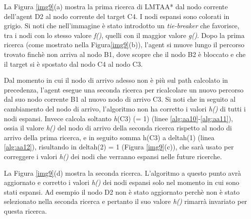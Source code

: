 \documentclass[11pt]{book}
\begin{document}
\par{La Figura \ref{img9}(a) mostra la prima ricerca di LMTAA* dal nodo corrente dell'agent D2 al nodo corrente del target C4. I nodi espansi sono colorati in grigio. Si noti che nell'immagine \`e stato introdotto un \emph{tie-breaker} che favorisce, tra i nodi con lo stesso valore \emph{f()}, quelli con il maggior valore \emph{g()}. Dopo la prima ricerca (come mostrato nella Figura\ref{img9}(b)), l'agent si muove lungo il percorso trovato finch\`e non arriva al nodo B1, dove scopre che il nodo B2 \`e bloccato e che il target si \`e spostato dal nodo C4 al nodo C3.}
\par{Dal momento in cui il nodo di arrivo adesso non \`e pi\`u sul path calcolato in precedenza, l'agent esegue una seconda ricerca per ricalcolare un nuovo percorso dal suo nodo corrente B1 al nuovo nodo di arrivo C3. Si noti che in seguito al cambiamento del nodo di arrivo, l'algoritmo non ha corretto i valori \emph{h()} di tutti i nodi espansi. Invece calcola soltanto \emph{h}(C3) (= 1) (linee \ref{alg:aa10}-\ref{alg:aa11}), ossia il valore \emph{h()} del nodo di arrivo della seconda ricerca rispetto al nodo di arrivo della prima ricerca, e in seguito somma h(C3) a deltah(1) (linea \ref{alg:aa12}), risultando in deltah(2) = 1 (Figura \ref{img9}(c)), che sar\`a usato per correggere i valori \emph{h()} dei nodi che verranno espansi nelle future ricerche.}
\par{La Figura \ref{img9}(d) mostra la seconda ricerca. L'algoritmo a questo punto avr\`a aggiornato e corretto i valori \emph{h()} dei nodi espansi solo nel momento in cui sono stati espansi. Ad esempio il nodo D2 non \`e stato aggiornato perch\`e non \`e stato selezionato nella seconda ricerca e pertanto il suo valore \emph{h()} rimarr\`a invariato per questa ricerca. }
\fi

\newcommand{\populateCell}[5]{
\node at (#1 +.14, #2 +.8) {\small$#3$};
\node at (#1 +.8,#2 +.8) {$#4$};
\node at (#1 +.14,#2 +.2) {$#5$};
}
\end{document}
